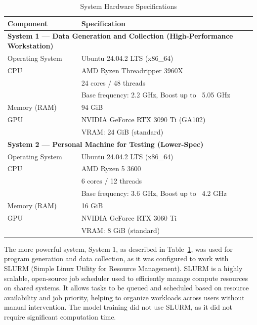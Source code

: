\begin{table}[htbp]
\centering
\caption{System Hardware Specifications}
\begin{tabular}{|l|p{10cm}|}
\hline
\textbf{Component} & \textbf{Specification} \\
\hline
\multicolumn{2}{|l|}{\textbf{System 1 — Data Generation and Collection (High-Performance Workstation)}} \\
\hline
Operating System & Ubuntu 24.04.2 LTS (x86\_64) \\
\hline
CPU & AMD Ryzen Threadripper 3960X \\
     & 24 cores / 48 threads \\
     & Base frequency: 2.2 GHz, Boost up to ~5.05 GHz \\
\hline
Memory (RAM) & 94 GiB \\
\hline
GPU & NVIDIA GeForce RTX 3090 Ti (GA102) \\
    & VRAM: 24 GiB (standard) \\
\hline

\multicolumn{2}{|l|}{\textbf{System 2 — Personal Machine for Testing (Lower-Spec)}} \\
\hline
Operating System & Ubuntu 24.04.2 LTS (x86\_64) \\
\hline
CPU & AMD Ryzen 5 3600 \\
     & 6 cores / 12 threads \\
     & Base frequency: 3.6 GHz, Boost up to ~4.2 GHz \\
\hline
Memory (RAM) & 16 GiB \\
\hline
GPU & NVIDIA GeForce RTX 3060 Ti \\
    & VRAM: 8 GiB (standard) \\
\hline
\end{tabular}
\label{tab:hardware_specs}
\end{table}

The more powerful system, System 1, as described in Table~\ref{tab:hardware_specs}, was used for program generation and data collection, as it was configured to work with SLURM (Simple Linux Utility for Resource Management). SLURM is a highly scalable, open-source job scheduler used to efficiently manage compute resources on shared systems. It allows tasks to be queued and scheduled based on resource availability and job priority, helping to organize workloads across users without manual intervention. The model training did not use SLURM, as it did not require significant computation time.





